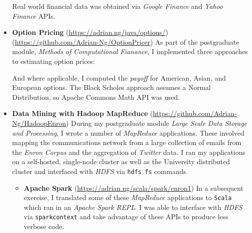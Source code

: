 \documentclass[letterpaper,11pt]{article}
\begin{document}
\begin{itemize}
{	      Real world financial data was obtained via \textit{Google Finance} and \textit{Yahoo Finance} APIs.
	      }
	\item
	      {
	      \textbf{Option Pricing}
	      \hfill
	      \tiny
	      (\href{https://adrian.ng/java/options/}{https://adrian.ng/java/options/}) \quad (\href{https://github.com/Adrian-Ng/OptionPricer}{https://github.com/Adrian-Ng/OptionPricer})
	      \newline
	      \small
	      As part of the postgraduate module, \textit{Methods of Computational Fianance}, I implemented three approaches to estimating option prices:
	      And where applicable, I computed the \textit{payoff} for American, Asian, and European options.
	      The Black Scholes approach assumes a Normal Distribution, so Apache Commons Math API was used.
	      }
	\item
	      {
	      \textbf{Data Mining with Hadoop MapReduce}
	      \hfill
	      \tiny
	      (\href{https://github.com/Adrian-Ng/HadoopEnron}{https://github.com/Adrian-Ng/HadoopEnron})
	      \small
	      \newline
	      During my postgraduate module \textit{Large Scale Data Storage and Processing}, I wrote a number of \textit{MapReduce} applications. These involved mapping the communications network from a large collection of emails from the \textit{Enron Corpus} and the aggregation of \textit{Twitter} data.
	      \newline
	      I ran my applications on a self-hosted, single-node cluster as well as the University distributed cluster and interfaced with \textit{HDFS} via \texttt{hdfs fs} commands.
	      \begin{itemize}
		      \item
		            \textbf{Apache Spark}
		            \hfill
		            \tiny
		            (\href{https://adrian.ng/scala/spark/enron1}{https://adrian.ng/scala/spark/enron1})
		            \small
		            \newline
		            In a subsequent exercise, I translated some of these \textit{MapReduce} applications to \texttt{Scala}  which ran in an \textit{Apache Spark REPL}. I was able to interface with \textit{HDFS} via \texttt{sparkcontext} and take advantage of these APIs to produce less verbose code.

\end{itemize}}
\end{itemize}
\end{document}
